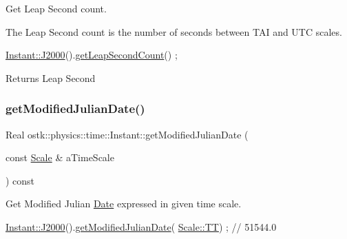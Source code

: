 Get Leap Second count. 

The Leap Second count is the number of seconds between T\+AI and U\+TC scales.


\begin{DoxyCode}
\hyperlink{classostk_1_1physics_1_1time_1_1_instant_a3f84d0c2d0b140326d3b172b54e3ffff}{Instant::J2000}().\hyperlink{classostk_1_1physics_1_1time_1_1_instant_aceab87ef79e6f5d1438ac78e11bdcd6f}{getLeapSecondCount}() ;
\end{DoxyCode}


\begin{DoxyReturn}{Returns}
Leap Second 
\end{DoxyReturn}
\mbox{\label{classostk_1_1physics_1_1time_1_1_instant_aeaaf152c806c5f98ad03933ede05fe2d}} 
\subsubsection{\texorpdfstring{get\+Modified\+Julian\+Date()}{getModifiedJulianDate()}}
{\footnotesize\ttfamily Real ostk\+::physics\+::time\+::\+Instant\+::get\+Modified\+Julian\+Date (\begin{DoxyParamCaption}\item[{const \hyperlink{namespaceostk_1_1physics_1_1time_adf23d37bd8641fb76a0e98ab46a70df7}{Scale} \&}]{a\+Time\+Scale }\end{DoxyParamCaption}) const}



Get Modified Julian \hyperlink{classostk_1_1physics_1_1time_1_1_date}{Date} expressed in given time scale. 


\begin{DoxyCode}
\hyperlink{classostk_1_1physics_1_1time_1_1_instant_a3f84d0c2d0b140326d3b172b54e3ffff}{Instant::J2000}().\hyperlink{classostk_1_1physics_1_1time_1_1_instant_aeaaf152c806c5f98ad03933ede05fe2d}{getModifiedJulianDate}(
      \hyperlink{namespaceostk_1_1physics_1_1time_adf23d37bd8641fb76a0e98ab46a70df7adf1f3edb9115acb0a1e04209b7a9937b}{Scale::TT}) ; \textcolor{comment}{// 51544.0}
\end{DoxyCode}



